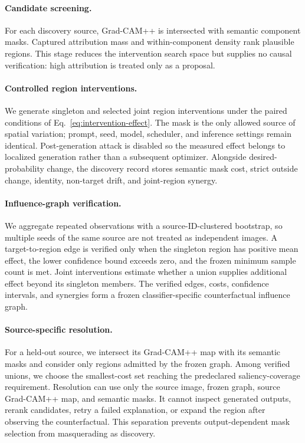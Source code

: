 \documentclass[10pt,twocolumn]{article}
\begin{document}
\paragraph{Candidate screening.}
For each discovery source, Grad-CAM++ is intersected with semantic component
masks. Captured attribution mass and within-component density rank plausible
regions. This stage reduces the intervention search space but supplies no
causal verification: high attribution is treated only as a proposal.

\paragraph{Controlled region interventions.}
We generate singleton and selected joint region interventions under the paired
conditions of Eq.~\eqref{eq:intervention-effect}. The mask is the only allowed
source of spatial variation; prompt, seed, model, scheduler, and inference
settings remain identical. Post-generation attack is disabled so the measured
effect belongs to localized generation rather than a subsequent optimizer.
Alongside desired-probability change, the discovery record stores semantic
mask cost, strict outside change, identity, non-target drift, and joint-region
synergy.

\paragraph{Influence-graph verification.}
We aggregate repeated observations with a source-ID-clustered bootstrap, so
multiple seeds of the same source are not treated as independent images. A
target-to-region edge is verified only when the singleton region has positive
mean effect, the lower confidence bound exceeds zero, and the frozen minimum
sample count is met. Joint interventions estimate whether a union supplies
additional effect beyond its singleton members. The verified edges, costs,
confidence intervals, and synergies form a frozen classifier-specific
counterfactual influence graph.

\paragraph{Source-specific resolution.}
For a held-out source, we intersect its Grad-CAM++ map with its semantic masks
and consider only regions admitted by the frozen graph. Among verified unions,
we choose the smallest-cost set reaching the predeclared saliency-coverage
requirement. Resolution can use only the source image, frozen graph, source
Grad-CAM++ map, and semantic masks. It cannot inspect generated outputs,
rerank candidates, retry a failed explanation, or expand the region after
observing the counterfactual. This separation prevents output-dependent mask
selection from masquerading as discovery.
\end{document}
